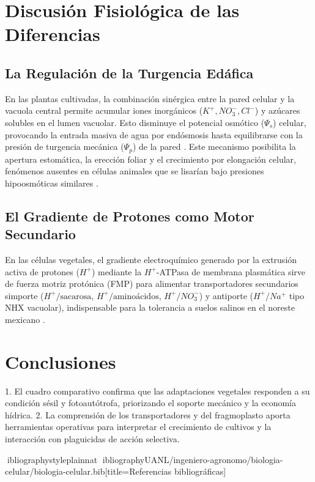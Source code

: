 \documentclass[spanish,letterpaper,oneside]{article}
\begin{document}
\section{Discusión Fisiológica de las Diferencias}
\subsection{La Regulación de la Turgencia Edáfica}
En las plantas cultivadas, la combinación sinérgica entre la pared celular y la vacuola central permite acumular iones inorgánicos ($K^+, NO_3^-, Cl^-$) y azúcares solubles en el lumen vacuolar. Esto disminuye el potencial osmótico ($\Psi_s$) celular, provocando la entrada masiva de agua por endósmosis hasta equilibrarse con la presión de turgencia mecánica ($\Psi_p$) de la pared \parencite{taiz2015}. Este mecanismo posibilita la apertura estomática, la erección foliar y el crecimiento por elongación celular, fenómenos ausentes en células animales que se lisarían bajo presiones hipoosmóticas similares \parencite{karp2014}.

\subsection{El Gradiente de Protones como Motor Secundario}
En las células vegetales, el gradiente electroquímico generado por la extrusión activa de protones ($H^+$) mediante la $H^+$-ATPasa de membrana plasmática sirve de fuerza motriz protónica (FMP) para alimentar transportadores secundarios simporte ($H^+/\text{sacarosa}$, $H^+/\text{aminoácidos}$, $H^+/NO_3^-$) y antiporte ($H^+/Na^+$ tipo NHX vacuolar), indispensable para la tolerancia a suelos salinos en el noreste mexicano \parencite{alberts2015}.

\section{Conclusiones}
1. El cuadro comparativo confirma que las adaptaciones vegetales responden a su condición sésil y fotoautótrofa, priorizando el soporte mecánico y la economía hídrica.
2. La comprensión de los transportadores y del fragmoplasto aporta herramientas operativas para interpretar el crecimiento de cultivos y la interacción con plaguicidas de acción selectiva.

\newpage
ibliographystyle{plainnat}
ibliography{UANL/ingeniero-agronomo/biologia-celular/biologia-celular.bib}[title={Referencias bibliográficas}]
\end{document}
